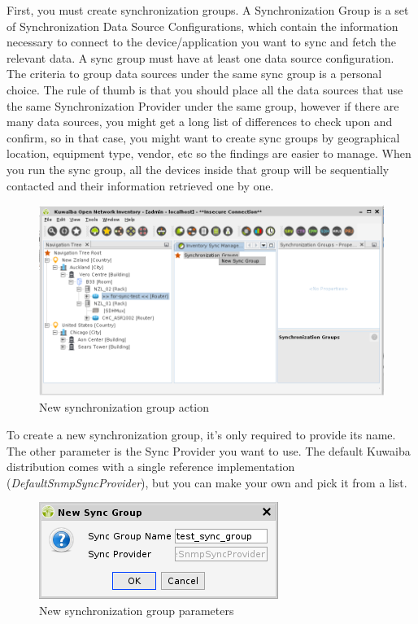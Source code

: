 \documentclass[a4paper]{article}
\begin{document}
			First, you must create synchronization groups. A Synchronization Group is a set of Synchronization Data Source Configurations, which contain the information necessary to connect to the device/application you want to sync and fetch the relevant data. A sync group must have at least one data source configuration. The criteria to group data sources under the same sync group is a personal choice. The rule of thumb is that you should place all the data sources that use the same Synchronization Provider under the same group, however if there are many data sources, you might get a long list of differences to check upon and confirm, so in that case, you might want to create sync groups by geographical location, equipment type, vendor, etc so the findings are easier to manage. When you run the sync group, all the devices inside that group will be sequentially contacted and their information retrieved one by one.\\
			
			\begin{figure}[h!]
				\centering
				\includegraphics[width=0.8\linewidth]{img/sync_new_sync_group.png}
				\caption{New synchronization group action}
				\label{fig:sync_new_sync_group}
			\end{figure}
			\newpage
			To create a new synchronization group, it's only required to provide its name. The other parameter is the Sync Provider you want to use. The default Kuwaiba distribution comes with a single reference implementation (\textit{DefaultSnmpSyncProvider}), but you can make your own and pick it from a list.

			\begin{figure}[h!]
				\centering
				\includegraphics[width=0.4\linewidth]{img/sync_sync_group_properties.png}
				\caption{New synchronization group parameters}
				\label{fig:sync_sync_group_properties}
			\end{figure}
\end{document}

